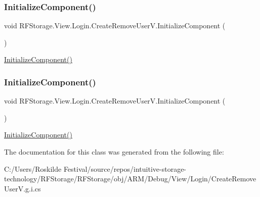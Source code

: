 \subsubsection{\texorpdfstring{InitializeComponent()}{InitializeComponent()}\hspace{0.1cm}{\footnotesize\ttfamily [6/7]}}
{\footnotesize\ttfamily void R\+F\+Storage.\+View.\+Login.\+Create\+Remove\+User\+V.\+Initialize\+Component (\begin{DoxyParamCaption}{ }\end{DoxyParamCaption})}



\mbox{\hyperlink{class_r_f_storage_1_1_view_1_1_login_1_1_create_remove_user_v_a697bd7e51938308bef2f5e96053dbecf}{Initialize\+Component()}} 

\mbox{\label{class_r_f_storage_1_1_view_1_1_login_1_1_create_remove_user_v_a697bd7e51938308bef2f5e96053dbecf}} 
\subsubsection{\texorpdfstring{InitializeComponent()}{InitializeComponent()}\hspace{0.1cm}{\footnotesize\ttfamily [7/7]}}
{\footnotesize\ttfamily void R\+F\+Storage.\+View.\+Login.\+Create\+Remove\+User\+V.\+Initialize\+Component (\begin{DoxyParamCaption}{ }\end{DoxyParamCaption})}



\mbox{\hyperlink{class_r_f_storage_1_1_view_1_1_login_1_1_create_remove_user_v_a697bd7e51938308bef2f5e96053dbecf}{Initialize\+Component()}} 



The documentation for this class was generated from the following file\+:\begin{DoxyCompactItemize}
\item 
C\+:/\+Users/\+Roskilde Festival/source/repos/intuitive-\/storage-\/technology/\+R\+F\+Storage/\+R\+F\+Storage/obj/\+A\+R\+M/\+Debug/\+View/\+Login/Create\+Remove\+User\+V.\+g.\+i.\+cs\end{DoxyCompactItemize}
